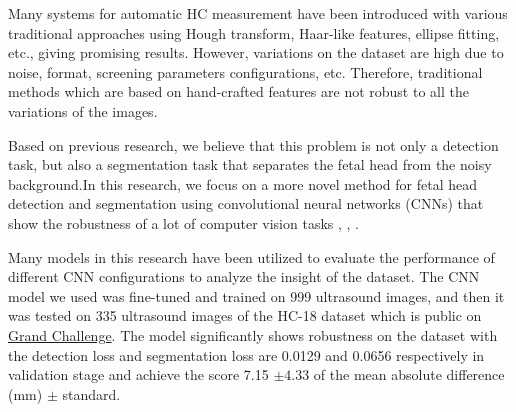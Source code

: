 	Many systems for automatic HC measurement have been introduced with various traditional approaches using Hough transform, Haar-like features, ellipse fitting, etc., giving promising results. However, variations on the dataset are high due to noise, format, screening parameters configurations, etc. Therefore, traditional methods which are based on hand-crafted features are not robust to all the variations of the images.
	
	Based on previous research, we believe that this problem is not only a detection task, but also a segmentation task that separates the fetal head from the noisy background.In this research, we focus on a more novel method for fetal head detection and segmentation using convolutional neural networks (CNNs) that show the robustness of a lot of computer vision tasks \cite{yamashita}, \cite{guidetocnn}, \cite{dlvstradition}. 
	
	Many models in this research have been utilized to evaluate the performance of different CNN configurations to analyze the insight of the dataset. The CNN model we used was fine-tuned and trained on 999 ultrasound images, and then it was tested on 335 ultrasound images of the HC-18 dataset which is public on \href{https://hc18.grand-challenge.org/}{Grand Challenge}. The model significantly shows robustness on the dataset with the detection loss and segmentation loss are 0.0129 and 0.0656 respectively in validation stage and achieve the score 7.15 $\pm 4.33$ of the mean absolute difference (mm) $\pm$ standard.

	
 
	
	

